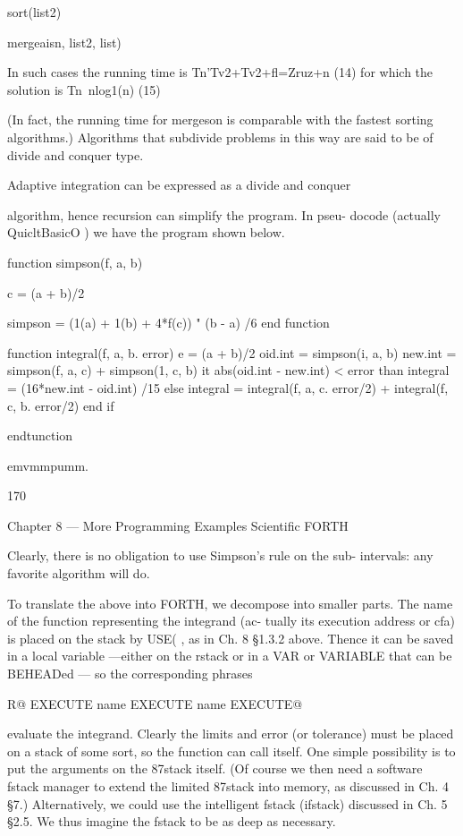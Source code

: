 {sort(list2)

mergeaisn, list2, list)

In such cases the running time is
Tn'Tv2+Tv2+ﬂ=Zruz+n (14)
for which the solution is
Tn~nlog1(n) (15)

(In fact, the running time for mergeson is comparable with the
fastest sorting algorithms.) Algorithms that subdivide problems
in this way are said to be of divide and conquer type.

Adaptive integration can be expressed as a divide and conquer

algorithm, hence recursion can simplify the program. In pseu-
docode (actually QuicltBasicO ) we have the program shown
below.

function simpson(f, a, b)

c = (a + b)/2

simpson = (1(a) + 1(b) + 4*f(c)) " (b - a) /6
end function

function integral(f, a, b. error)
e = (a + b)/2
oid.int = simpson(i, a, b)
new.int = simpson(f, a, c) + simpson(1, c, b)
it abs(oid.int - new.int) < error than
integral = (16*new.int - oid.int) /15
else
integral = integral(f, a, c. error/2) +
integral(f, c, b. error/2)
end if

endtunction

emvmmpumm.

170

Chapter 8 — More Programming Examples Scientiﬁc FORTH

Clearly, there is no obligation to use Simpson's rule on the sub-
intervals: any favorite algorithm will do.

To translate the above into FORTH, we decompose into smaller
parts. The name of the function representing the integrand (ac-
tually its execution address or cfa) is placed on the stack by USE( ,
as in Ch. 8 §1.3.2 above. Thence it can be saved in a local variable
—either on the rstack or in a VAR or VARIABLE that can be
BEHEADed — so the corresponding phrases

R@ EXECUTE \rstack
name EXECUTE \VAFI
name EXECUTE@ \VARIABLE

evaluate the integrand. Clearly the limits and error (or tolerance)
must be placed on a stack of some sort, so the function can call
itself. One simple possibility is to put the arguments on the
87stack itself. (Of course we then need a software fstack manager
to extend the limited 87stack into memory, as discussed in
Ch. 4 §7.) Alternatively, we could use the intelligent fstack
(ifstack) discussed in Ch. 5 §2.5. We thus imagine the fstack to be
as deep as necessary.

}
